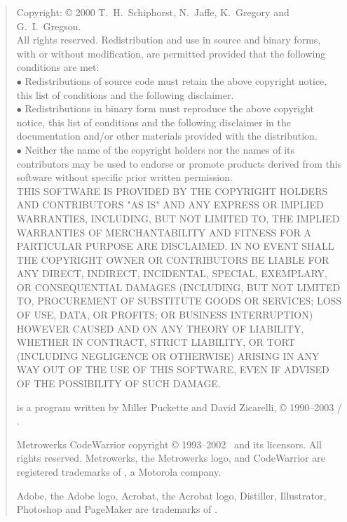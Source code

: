 \begin{quote}
\begin{small}
Copyright: \copyright{} 2000 T.~H.~Schiphorst, N.~Jaffe, K.~Gregory and G.~I.~Gregson.
\\
All rights reserved. Redistribution and use in source and binary forms,
with or without modification, are permitted provided that the following conditions are met:\\
$\bullet$ Redistributions of source code must retain the above copyright notice,
this list of conditions and the following disclaimer.\\
$\bullet$ Redistributions in binary form must reproduce the above copyright notice,
this list of conditions and the following disclaimer in the documentation and/or other materials provided with the distribution.\\
$\bullet$ Neither the name of the copyright holders nor the names of its contributors may be used to endorse
or promote products derived from this software without specific prior written permission.\\
THIS SOFTWARE IS PROVIDED BY THE COPYRIGHT HOLDERS AND CONTRIBUTORS "AS IS" AND ANY EXPRESS OR IMPLIED WARRANTIES,
INCLUDING, BUT NOT LIMITED TO, THE IMPLIED WARRANTIES OF MERCHANTABILITY AND FITNESS FOR A PARTICULAR PURPOSE ARE DISCLAIMED.
IN NO EVENT SHALL THE COPYRIGHT OWNER OR CONTRIBUTORS BE LIABLE FOR ANY DIRECT, INDIRECT, INCIDENTAL, SPECIAL, EXEMPLARY,
OR CONSEQUENTIAL DAMAGES (INCLUDING, BUT NOT LIMITED TO, PROCUREMENT OF SUBSTITUTE GOODS OR SERVICES;
LOSS OF USE, DATA, OR PROFITS; OR BUSINESS INTERRUPTION) HOWEVER CAUSED AND ON ANY THEORY OF LIABILITY, WHETHER IN CONTRACT,
STRICT LIABILITY, OR TORT (INCLUDING NEGLIGENCE OR OTHERWISE) ARISING IN ANY WAY OUT OF THE USE OF THIS SOFTWARE,
EVEN IF ADVISED OF THE POSSIBILITY OF SUCH DAMAGE.

\MaxName{} is a program written by Miller Puckette and David Zicarelli, \copyright{} 1990--2003
 / .

Metrowerks CodeWarrior copyright \copyright{} 1993--2002 \ and
its licensors.
All rights reserved.
Metrowerks, the Metrowerks logo, and CodeWarrior are registered trademarks of
, a Motorola company.

Adobe, the Adobe logo, Acrobat, the Acrobat logo, Distiller, Illustrator, Photoshop and PageMaker are trademarks of
.


\end{small}
\end{quote}
